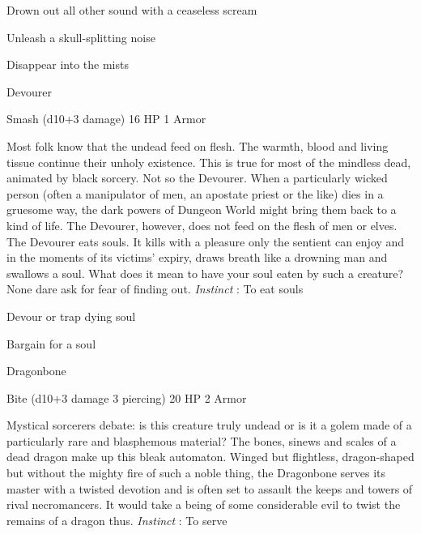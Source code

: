 \startitemize[1,packed]

\item Drown out all other sound with a ceaseless scream

 
\item Unleash a skull-splitting noise

 
\item Disappear into the mists


\stopitemize
 
\startMonsterName
Devourer	 
\stopMonsterName
 

Smash (d10+3 damage)	16 HP	1 Armor

 


 
\startMonsterDescription
Most folk know that the undead feed on flesh.  The warmth, blood and living tissue continue their unholy existence.  This is true for most of the mindless dead, animated by black sorcery.  Not so the Devourer.  When a particularly wicked person (often a manipulator of men, an apostate priest or the like) dies in a gruesome way, the dark powers of Dungeon World might bring them back to a kind of life.  The Devourer, however, does not feed on the flesh of men or elves.  The Devourer eats souls.  It kills with a pleasure only the sentient can enjoy and in the moments of its victims’ expiry, draws breath like a drowning man and swallows a soul.  What does it mean to have your soul eaten by such a creature?  None dare ask for fear of finding out. {\em Instinct} : To eat souls
\stopMonsterDescription
 
\startitemize[1,packed]

\item Devour or trap dying soul

 
\item Bargain for a soul


\stopitemize
 
\startMonsterName
Dragonbone	 
\stopMonsterName
 

Bite (d10+3 damage 3 piercing)	20 HP	2 Armor

 


 
\startMonsterDescription
Mystical sorcerers debate: is this creature truly undead or is it a golem made of a particularly rare and blasphemous material?  The bones, sinews and scales of a dead dragon make up this bleak automaton.  Winged but flightless, dragon-shaped but without the mighty fire of such a noble thing, the Dragonbone serves its master with a twisted devotion and is often set to assault the keeps and towers of rival necromancers.  It would take a being of some considerable evil to twist the remains of a dragon thus. {\em Instinct} : To serve
\stopMonsterDescription
 
